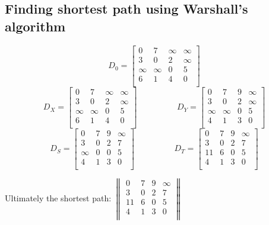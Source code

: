 \documentclass[11 pt]{article}
\begin{document}
\subsection{Finding shortest path using Warshall's algorithm}
$$
D_0=
\begin{bmatrix}
	0 & 7 & \infty & \infty \\
	3 & 0 & 2 & \infty \\
	\infty & \infty & 0 & 5 \\
	6 & 1 & 4 & 0 \\
\end{bmatrix}
$$
\vspace{0.5cm}
$$
D_X=
\begin{bmatrix}
0 & 7 & \infty & \infty \\
3 & 0 & 2 & \infty \\
\infty & \infty & 0 & 5 \\
6 & 1 & 4 & 0 \\
\end{bmatrix}
\hspace{2cm}
D_Y=
\begin{bmatrix}
0 & 7 & 9 & \infty \\
3 & 0 & 2 & \infty \\
\infty & \infty & 0 & 5 \\
4 & 1 & 3 & 0 \\
\end{bmatrix}
$$
\vspace{0.5cm}
$$
D_S=
\begin{bmatrix}
0 & 7 & 9 & \infty \\
3 & 0 & 2 & 7 \\
\infty & 0 & 0 & 5 \\
4 & 1 & 3 & 0 \\
\end{bmatrix}
\hspace{2cm}
D_T=
\begin{bmatrix}
0 & 7 & 9 & \infty \\
3 & 0 & 2 & 7 \\
11 & 6 & 0 & 5 \\
4 & 1 & 3 & 0 \\
\end{bmatrix}
$$

Ultimately the shortest path: 
$
\textrm{}
\begin{Vmatrix}
0 & 7 & 9 & \infty \\
3 & 0 & 2 & 7 \\
11 & 6 & 0 & 5 \\
4 & 1 & 3 & 0 \\
\end{Vmatrix}
$

\pagebreak
\printindex
\end{document}
